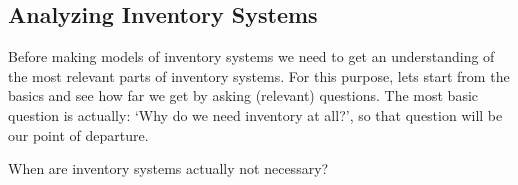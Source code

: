 \subsection{Analyzing Inventory Systems}
\label{sec:analyz-invent-syst}

Before making models of inventory systems we need to get an
understanding of the most relevant parts of inventory systems.  For
this purpose, lets start from the basics and see how far we get by
asking (relevant) questions.  The most basic question is actually:
`Why do we need inventory at all?', so that question will be our point
of departure.

\begin{exercise}
  When are inventory systems actually not necessary?

\end{exercise}




